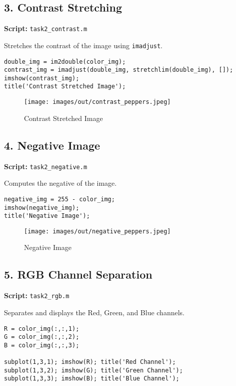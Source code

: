 \documentclass[12pt,a4paper]{article}
\begin{document}
\subsection*{3. Contrast Stretching}
\textbf{Script:} \texttt{task2\_contrast.m}

Stretches the contrast of the image using \texttt{imadjust}.

\begin{verbatim}
double_img = im2double(color_img);
contrast_img = imadjust(double_img, stretchlim(double_img), []);
imshow(contrast_img);
title('Contrast Stretched Image');
\end{verbatim}

\begin{figure}[H]
    \centering
    \texttt{[image: images/out/contrast\_peppers.jpeg]}
    \caption{Contrast Stretched Image}
\end{figure}

\subsection*{4. Negative Image}
\textbf{Script:} \texttt{task2\_negative.m}

Computes the negative of the image.

\begin{verbatim}
negative_img = 255 - color_img;
imshow(negative_img);
title('Negative Image');
\end{verbatim}

\begin{figure}[H]
    \centering
    \texttt{[image: images/out/negative\_peppers.jpeg]}
    \caption{Negative Image}
\end{figure}

\subsection*{5. RGB Channel Separation}
\textbf{Script:} \texttt{task2\_rgb.m}

Separates and displays the Red, Green, and Blue channels.

\begin{verbatim}
R = color_img(:,:,1);
G = color_img(:,:,2);
B = color_img(:,:,3);

subplot(1,3,1); imshow(R); title('Red Channel');
subplot(1,3,2); imshow(G); title('Green Channel');
subplot(1,3,3); imshow(B); title('Blue Channel');
\end{verbatim}
\end{document}

